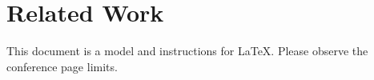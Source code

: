 \section{Related Work}
This document is a model and instructions for \LaTeX.
Please observe the conference page limits. 
